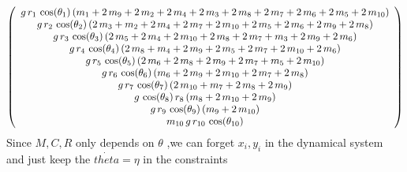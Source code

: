 $$ \left( \begin{array}{c} g\,r_{1}\,\cos({\theta_{1}})\,(m_{1}+2\,m_{
9}+2\,m_{2}+2\,m_{4}+2\,m_{3}+2\,m_{8}+2\,m_{7}+2\,m_{6}+2\,m_{5}+2\,m
_{10}) \cr g\,r_{2}\,\cos({\theta_{2}})\,(2\,m_{3}+m_{2}+2\,m_{4}+2\,m
_{7}+2\,m_{10}+2\,m_{5}+2\,m_{6}+2\,m_{9}+2\,m_{8}) \cr g\,r_{3}\,\cos
({\theta_{3}})\,(2\,m_{5}+2\,m_{4}+2\,m_{10}+2\,m_{8}+2\,m_{7}+m_{3}+2
\,m_{9}+2\,m_{6}) \cr g\,r_{4}\,\cos({\theta_{4}})\,(2\,m_{8}+m_{4}+2
\,m_{9}+2\,m_{5}+2\,m_{7}+2\,m_{10}+2\,m_{6}) \cr g\,r_{5}\,\cos({
\theta_{5}})\,(2\,m_{6}+2\,m_{8}+2\,m_{9}+2\,m_{7}+m_{5}+2\,m_{10})
 \cr g\,r_{6}\,\cos({\theta_{6}})\,(m_{6}+2\,m_{9}+2\,m_{10}+2\,m_{7}+
2\,m_{8}) \cr g\,r_{7}\,\cos({\theta_{7}})\,(2\,m_{10}+m_{7}+2\,m_{8}+
2\,m_{9}) \cr g\,\cos({\theta_{8}})\,r_{8}\,(m_{8}+2\,m_{10}+2\,m_{9})
 \cr g\,r_{9}\,\cos({\theta_{9}})\,(m_{9}+2\,m_{10}) \cr m_{10}\,g\,r
_{10}\,\cos({\theta_{10}}) \end{array} \right) $$
Since $M,C,R$ only depends on $\theta$ 
,we can forget $x_i,y_i$ in the dynamical system 
 and just keep the $\dot{theta}=\eta$ in the	constraints
